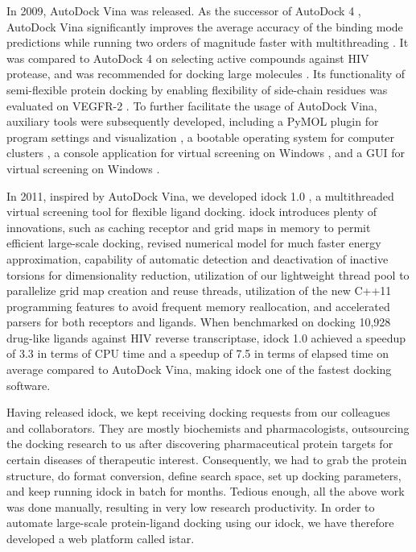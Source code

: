 \documentclass[10pt, conference, compsocconf]{../IEEEtran}
\begin{document}
In 2009, AutoDock Vina \cite{595} was released. As the successor of AutoDock 4 \cite{596}, AutoDock Vina significantly improves the average accuracy of the binding mode predictions while running two orders of magnitude faster with multithreading \cite{595}. It was compared to AutoDock 4 on selecting active compounds against HIV protease, and was recommended for docking large molecules \cite{556}. Its functionality of semi-flexible protein docking by enabling flexibility of side-chain residues was evaluated on VEGFR-2 \cite{1084}. To further facilitate the usage of AutoDock Vina, auxiliary tools were subsequently developed, including a PyMOL \cite{1221} plugin for program settings and visualization \cite{609}, a bootable operating system for computer clusters \cite{773}, a console application for virtual screening on Windows \cite{1268}, and a GUI for virtual screening on Windows \cite{1250}.

In 2011, inspired by AutoDock Vina, we developed idock 1.0 \cite{1153}, a multithreaded virtual screening tool for flexible ligand docking. idock introduces plenty of innovations, such as caching receptor and grid maps in memory to permit efficient large-scale docking, revised numerical model for much faster energy approximation, capability of automatic detection and deactivation of inactive torsions for dimensionality reduction, utilization of our lightweight thread pool to parallelize grid map creation and reuse threads, utilization of the new C++11 programming features to avoid frequent memory reallocation, and accelerated parsers for both receptors and ligands. When benchmarked on docking 10,928 drug-like ligands against HIV reverse transcriptase, idock 1.0 achieved a speedup of 3.3 in terms of CPU time and a speedup of 7.5 in terms of elapsed time on average compared to AutoDock Vina, making idock one of the fastest docking software.

Having released idock, we kept receiving docking requests from our colleagues and collaborators. They are mostly biochemists and pharmacologists, outsourcing the docking research to us after discovering pharmaceutical protein targets for certain diseases of therapeutic interest. Consequently, we had to grab the protein structure, do format conversion, define search space, set up docking parameters, and keep running idock in batch for months. Tedious enough, all the above work was done manually, resulting in very low research productivity. In order to automate large-scale protein-ligand docking using our idock, we have therefore developed a web platform called istar.
\end{document}
